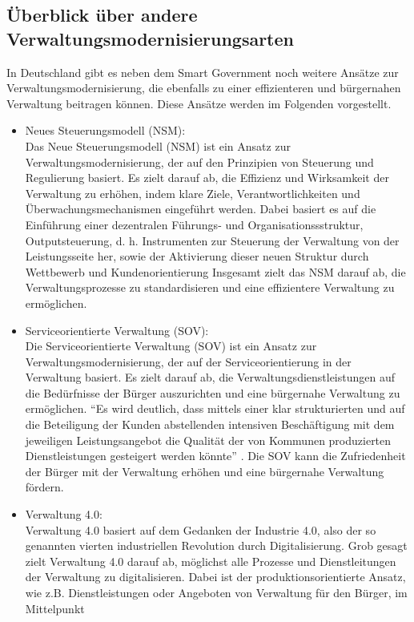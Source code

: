 \subsection{Überblick über andere Verwaltungsmodernisierungsarten}
In Deutschland gibt es neben dem Smart Government noch weitere Ansätze zur Verwaltungsmodernisierung, die ebenfalls zu einer effizienteren und bürgernahen Verwaltung beitragen können. 
Diese Ansätze werden im Folgenden vorgestellt.

\begin{itemize}
 \item Neues Steuerungsmodell (NSM):\\
Das Neue Steuerungsmodell (NSM) ist ein Ansatz zur Verwaltungsmodernisierung, der auf den Prinzipien von Steuerung und Regulierung basiert. 
Es zielt darauf ab, die Effizienz und Wirksamkeit der Verwaltung zu erhöhen, indem klare Ziele, Verantwortlichkeiten und Überwachungsmechanismen eingeführt werden.
Dabei basiert es auf die Einführung einer dezentralen Führungs- und Organisationssstruktur, Outputsteuerung, d. h. Instrumenten zur Steuerung der Verwaltung von der Leistungsseite her, sowie der Aktivierung dieser neuen Struktur durch Wettbewerb und Kundenorientierung \citep[Vgl.][S.131]{Veit2019}
Insgesamt zielt das NSM darauf ab, die Verwaltungsprozesse zu standardisieren und eine effizientere Verwaltung zu ermöglichen.
\item Serviceorientierte Verwaltung (SOV):\\
Die Serviceorientierte Verwaltung (SOV) ist ein Ansatz zur Verwaltungsmodernisierung, der auf der Serviceorientierung in der Verwaltung basiert. 
Es zielt darauf ab, die Verwaltungsdienstleistungen auf die Bedürfnisse der Bürger auszurichten und eine bürgernahe Verwaltung zu ermöglichen.
``Es wird deutlich, dass mittels einer klar strukturierten und auf die Beteiligung der Kunden abstellenden intensiven Beschäftigung mit dem jeweiligen Leistungsangebot die Qualität der von Kommunen produzierten Dienstleistungen gesteigert werden könnte'' \citep[][S. 35]{Vogelgesang2016}.  
Die SOV kann die Zufriedenheit der Bürger mit der Verwaltung erhöhen und eine bürgernahe Verwaltung fördern.
\item Verwaltung 4.0:\\
Verwaltung 4.0 basiert auf dem Gedanken der Industrie 4.0, also der so genannten vierten industriellen Revolution durch Digitalisierung.
Grob gesagt zielt Verwaltung 4.0 darauf ab, möglichst alle Prozesse und Dienstleitungen der Verwaltung zu digitalisieren.
Dabei ist der produktionsorientierte Ansatz, wie z.B. Dienstleistungen oder Angeboten von Verwaltung für den Bürger, im Mittelpunkt \citep[Vgl.][S. 27-28]{Schuppan2016}
\end{itemize}

